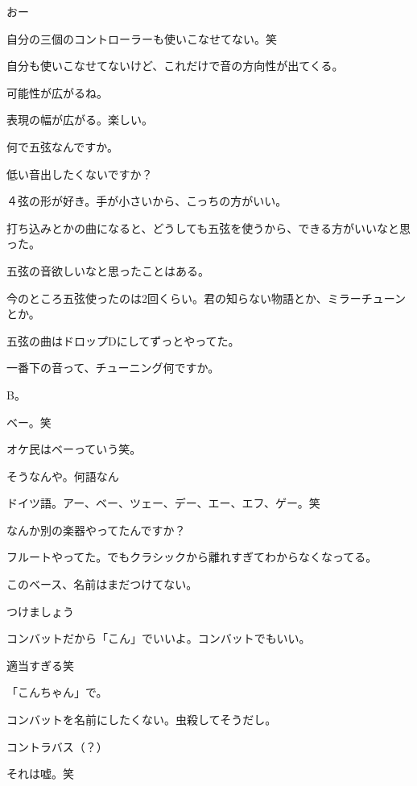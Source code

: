 \begin{multicols}{3}
おー

自分の三個のコントローラーも使いこなせてない。笑

自分も使いこなせてないけど、これだけで音の方向性が出てくる。

可能性が広がるね。

表現の幅が広がる。楽しい。

何で五弦なんですか。

低い音出したくないですか？

４弦の形が好き。手が小さいから、こっちの方がいい。

打ち込みとかの曲になると、どうしても五弦を使うから、できる方がいいなと思った。

五弦の音欲しいなと思ったことはある。

今のところ五弦使ったのは2回くらい。君の知らない物語とか、ミラーチューンとか。

五弦の曲はドロップDにしてずっとやってた。

一番下の音って、チューニング何ですか。

B。

ベー。笑

オケ民はベーっていう笑。

そうなんや。何語なん

ドイツ語。アー、ベー、ツェー、デー、エー、エフ、ゲー。笑

なんか別の楽器やってたんですか？

フルートやってた。でもクラシックから離れすぎてわからなくなってる。

このベース、名前はまだつけてない。

つけましょう

コンバットだから「こん」でいいよ。コンバットでもいい。

適当すぎる笑

「こんちゃん」で。

コンバットを名前にしたくない。虫殺してそうだし。

コントラバス（？）

それは嘘。笑


\end{multicols}
